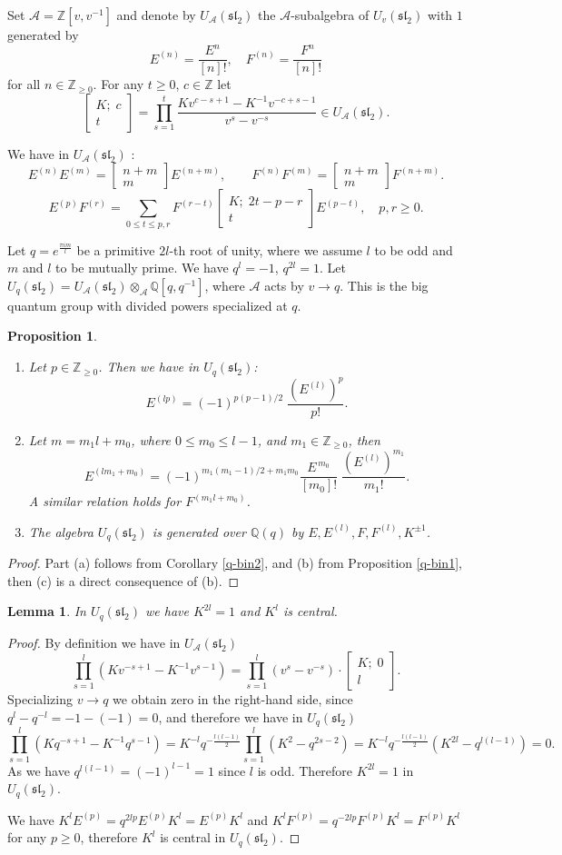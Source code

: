 \documentclass[11pt]{amsart}
\newcommand\lie[1]{\mathfrak{#1}}
\newcommand\qbin[2]{\left[  \begin{array}{c}  #1 \\ #2  \end{array}  \right]}
\newcommand{\Z}{\mathbb{Z}}
\newcommand{\Q}{\mathbb{Q}}
\newcommand{\A}{\mathcal A}
\newtheorem{proposition}[theorem]{Proposition}
\newtheorem{lemma}[theorem]{Lemma}
\begin{document}
Set $\A = \Z[v, v^{-1}]$ and denote by $U_\A(\lie{sl}_2)$ the $\A$-subalgebra of $U_v(\lie{sl}_2)$ with $1$  generated by 
\[ E^{(n)} = \frac{E^n}{[n]!},   \quad F^{(n)} = \frac{F^n}{[n]!} \] 
for all $n \in \mathbb{Z}_{\geq 0}$. 
For any $t \geq 0$, $c \in \Z$  let 
\[ \qbin{K;\; c}{t} = \prod_{s=1}^t \frac{K v^{c-s+1} - K^{-1} v^{-c+s-1}}{v^s - v^{-s}}  \in U_\A(\lie{sl}_2) .\] 


We have in $U_\A(\lie{sl}_2)$ \cite{Lus89}: 
\[ E^{(n)} E^{(m)} = \qbin{n+m}{m} E^{(n+m)} , \quad \quad F^{(n)} F^{(m)} = \qbin{n+m}{m} F^{(n+m)} .\] 
\[ E^{(p)} F^{(r)} = \sum_{0 \leq t \leq p,r} F^{(r-t)} \qbin{K ; \; 2t-p-r}{t} E^{(p-t)} ,  \quad  p, r \geq 0. \] 

Let $q = e^{\frac{\pi im}{l}}$ be a primitive $2l$-th root of unity, where we assume $l$ to be odd and $m$ and $l$ to be mutually prime. We have $q^l =-1$, $q^{2l} =1$.  Let $U_q(\lie{sl}_2) = U_\A(\lie{sl}_2) \otimes_{\A} \Q[q,q^{-1}]$, where $\A$ acts by $v \rightarrow q$. This is the big quantum group with divided powers specialized at $q$. 
\begin{proposition}  \label{E^lp}
\begin{enumerate} 
\item  Let $p \in \mathbb{Z}_{\geq 0}$. Then we have in $U_q(\lie{sl}_2)$: 
\[ E^{(lp)} = (-1)^{p(p-1)/2} \; \frac{(E^{(l)})^p}{p!}  .\] 
\item Let $m = m_1 l + m_0$, where $0 \leq m_0 \leq l-1$, and $m_1 \in \mathbb{Z}_{\geq 0}$, then 
\[ E^{(lm_1 + m_0)} = (-1)^{m_1(m_1-1)/2+ m_1m_0} \frac{E^{\,m_0}}{[m_0]!} \; \frac{(E^{(l)})^{m_1}}{m_1!}  .\] 
A similar relation holds for $F^{(m_1 l + m_0)}$. 
\item The algebra $U_q(\lie{sl}_2)$ is generated over $\Q(q)$ by $E, E^{(l)}, F, F^{(l)}, K^{\pm 1}$. 
\end{enumerate} 
\end{proposition} 
\begin{proof} 
Part (a) follows from Corollary \ref{q-bin2}, and (b) from Proposition \ref{q-bin1}, then (c) is a direct consequence of (b). 
\end{proof} 


\begin{lemma} 
In $U_q(\lie{sl}_2)$ we have $K^{2l}=1$ and $K^l$ is central. 
\end{lemma} 
\begin{proof} 
By definition we have in $U_\A(\lie{sl}_2)$ 
\[ \prod_{s=1}^l (K v^{-s+1} - K^{-1} v^{s-1}) = \prod_{s=1}^l (v^s - v^{-s}) \cdot \qbin{K; \; 0}{l} .\] 
Specializing $v \to q$ we obtain  zero in the right-hand side, since $q^l - q^{-l} = -1 -(-1) =0$, and therefore we have in 
$U_q(\lie{sl}_2)$ 
\[ \prod_{s=1}^l (K q^{-s+1} - K^{-1} q^{s-1}) = K^{-l}  q^{-\frac{l(l-1)}{2}} \prod_{s=1}^l (K^2 - q^{2s-2}) =  K^{-l}  q^{-\frac{l(l-1)}{2}} (K^{2l} -q^{l(l-1)} ) = 0 .\] 
As we have $q^{l(l-1)} = (-1)^{l-1} =1$ since $l$ is odd. Therefore $K^{2l} =1$  in $U_q(\lie{sl}_2)$.  

We have $K^l E^{(p)} = q^{2lp} E^{(p)} K^l = E^{(p)} K^l$ and $K^l F^{(p)} = q^{-2lp} F^{(p)} K^l = F^{(p)} K^l$ for any $p \geq 0$, 
therefore $K^l$ is central in $U_q(\lie{sl}_2)$. 
\end{proof} 
\end{document}
